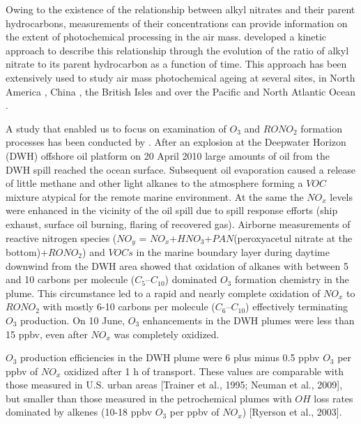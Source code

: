 \documentclass[11pt,a4paper]{article}
\begin{document}
Owing to the existence of the relationship between alkyl nitrates and their parent hydrocarbons, measurements of their concentrations can provide information on the extent of photochemical processing in the air mass. \cite{Bertman1995} developed a kinetic approach to describe this relationship through the evolution of the ratio of alkyl nitrate to its parent hydrocarbon as a function of time. This approach has been extensively used to study air mass photochemical ageing at several sites, in North America \citep{Bertman1995,Roberts1998}, China \citep{Simpson2006}, the British Isles \citep{Worton2010} and over the Pacific \citep{Simpson2003} and North Atlantic Ocean \citep{Reeves2007,Stroud2001}.

A study that enabled us to focus on examination of $O_3$ and $RONO_2$ formation processes has been conducted by \citep{Neuman2012}. After an explosion at the Deepwater Horizon (DWH) offshore oil platform on 20 April 2010 large amounts of oil from the DWH spill reached the ocean surface. Subsequent oil evaporation caused a release of little methane and other light alkanes to the atmosphere forming a $VOC$ mixture atypical for the remote marine environment. At the same the $NO_x$ levels were enhanced in the vicinity of the oil spill due to spill response efforts (ship exhaust, surface oil burning, flaring of recovered gas). Airborne measurements of reactive nitrogen species ($NO_y$ = $NO_x$+$HNO_3$+$PAN$(peroxyacetul nitrate at the bottom)+$RONO_2$) and $VOCs$ in the marine boundary layer during daytime downwind from the DWH area showed that oxidation of alkanes with between 5 and 10 carbons per molecule ($C_5$–$C_{10}$) dominated $O_3$ formation chemistry in the plume. This circumstance led to a rapid and nearly complete oxidation of $NO_x$ to $RONO_2$ with mostly 6-10 carbons per molecule ($C_6$–$C_{10}$) effectively terminating $O_3$ production. On 10 June, $O_3$ enhancements in the DWH plumes were less than 15 ppbv, even after $NO_x$ was completely oxidized. 

$O_3$ production efficiencies in the DWH plume were 6 plus minus 0.5 ppbv $O_3$ per ppbv of $NO_x$ oxidized after 1 h of transport. These values are comparable with those measured in U.S. urban areas [Trainer et al., 1995; Neuman et al., 2009], but smaller than those measured in the petrochemical plumes with $OH$ loss rates dominated by alkenes (10-18 ppbv $O_3$ per ppbv of $NO_x$) [Ryerson et al., 2003].
\end{document}
